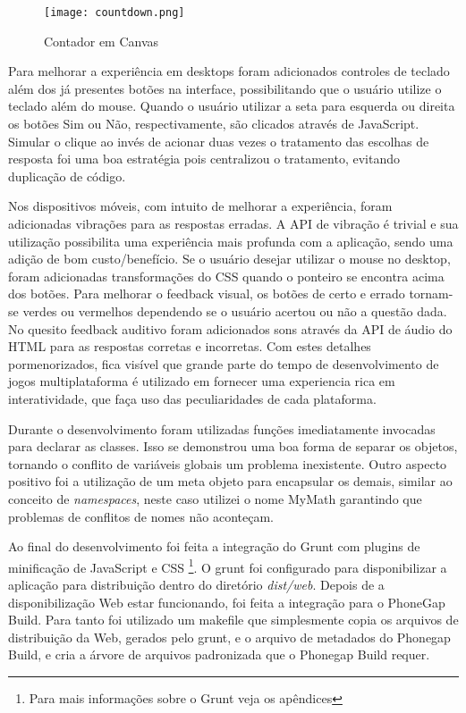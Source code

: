 \begin{figure}[H]
    \centering
    \texttt{[image: countdown.png]}
	\caption{Contador em Canvas}
    \label{fig:counter}
\end{figure}

Para melhorar a experiência em desktops foram adicionados controles de
teclado além dos já presentes botões na interface, possibilitando que
o usuário utilize o teclado além do mouse. Quando o usuário utilizar
a seta para esquerda ou direita os botões Sim ou Não, respectivamente,
são clicados através de JavaScript. Simular o clique ao invés de
acionar duas vezes o tratamento das escolhas de resposta foi uma boa
estratégia pois centralizou o tratamento, evitando duplicação de
código.

Nos dispositivos móveis, com intuito de melhorar a experiência, foram
adicionadas vibrações para as respostas erradas. A API de vibração
é trivial e sua utilização possibilita uma experiência mais
profunda com a aplicação, sendo uma adição de bom custo/benefício.
Se o usuário desejar utilizar o mouse no desktop, foram adicionadas
transformações do CSS quando o ponteiro se encontra acima dos
botões. Para melhorar o feedback visual, os botões de certo e errado
tornam-se verdes ou vermelhos dependendo se o usuário acertou ou não
a questão dada. No quesito feedback auditivo foram adicionados sons
através da API de áudio do HTML para as respostas corretas e incorretas. Com estes
detalhes pormenorizados, fica visível que grande parte do tempo de
desenvolvimento de jogos multiplataforma é utilizado em fornecer uma
experiencia rica em interatividade, que faça uso das peculiaridades de
cada plataforma.

Durante o desenvolvimento foram utilizadas funções imediatamente
invocadas para declarar as classes. Isso se demonstrou uma boa forma
de separar os objetos, tornando o conflito de variáveis globais um
problema inexistente. Outro aspecto positivo foi a utilização de
um meta objeto para encapsular os demais, similar ao conceito de
\textit{namespaces}, neste caso utilizei o nome MyMath garantindo que
problemas de conflitos de nomes não aconteçam.

Ao final do desenvolvimento foi feita a integração do Grunt com
plugins de minificação de JavaScript e CSS \footnote{Para mais
informações sobre o Grunt veja os apêndices}. O grunt foi configurado
para disponibilizar a aplicação para distribuição dentro do
diretório \textit{dist/web}. Depois de a disponibilização Web estar
funcionando, foi feita a integração para o PhoneGap Build. Para
tanto foi utilizado um makefile que simplesmente copia os arquivos de
distribuição da Web, gerados pelo grunt, e o arquivo de metadados do
Phonegap Build, e cria a árvore de arquivos padronizada que o Phonegap 
Build requer.

